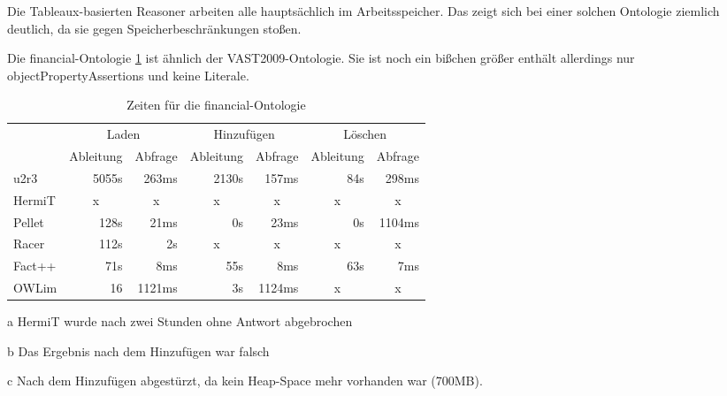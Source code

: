Die Tableaux-basierten Reasoner arbeiten alle hauptsächlich im Arbeitsspeicher. Das zeigt sich bei einer solchen Ontologie ziemlich deutlich, da sie gegen Speicherbeschränkungen stoßen.

Die financial-Ontologie \ref{table-time-financial} ist ähnlich der VAST2009-Ontologie. Sie ist noch ein bißchen größer enthält allerdings nur objectPropertyAssertions und keine Literale.

\begin{table}[htbp]
\caption{Zeiten für die financial-Ontologie}
\label{table-time-financial}
\begin{center}
\begin{threeparttable}
\begin{tabular}{l|r|r|r|r|r|r|}
\cline{2-7}
 & \multicolumn{2}{|c|}{Laden} & \multicolumn{2}{|c|}{Hinzufügen} & \multicolumn{2}{|c|}{Löschen} \\
\cline{2-7}
 & \multicolumn{1}{|c|}{Ableitung} & \multicolumn{1}{|c|}{Abfrage} & \multicolumn{1}{|c|}{Ableitung} & \multicolumn{1}{|c|}{Abfrage} & \multicolumn{1}{|c|}{Ableitung} & \multicolumn{1}{|c|}{Abfrage} \\
\hline
\multicolumn{1}{|l|}{u2r3} & 5055s & 263ms & 2130s & 157ms & 84s & 298ms \\ \hline
\multicolumn{1}{|l|}{HermiT\tnote{a}} & \multicolumn{1}{c|}{x} & \multicolumn{1}{c|}{x} & \multicolumn{1}{c|}{x} & \multicolumn{1}{c|}{x} & \multicolumn{1}{c|}{x} & \multicolumn{1}{c|}{x} \\ \hline
\multicolumn{1}{|l|}{Pellet\tnote{b}} & 128s & 21ms & 0s & 23ms & 0s & 1104ms \\ \hline
\multicolumn{1}{|l|}{Racer\tnote{c}} & 112s & 2s & \multicolumn{1}{c|}{x} & \multicolumn{1}{c|}{x} & \multicolumn{1}{c|}{x} & \multicolumn{1}{c|}{x} \\ \hline
\multicolumn{1}{|l|}{Fact++} & 71s & 8ms & 55s & 8ms & 63s & 7ms \\ \hline
\multicolumn{1}{|l|}{OWLim} & 16 & 1121ms & 3s & 1124ms & \multicolumn{1}{c|}{x} & \multicolumn{1}{c|}{x} \\ \hline
\end{tabular}
\begin{tablenotes}
	\item[a] HermiT wurde nach zwei Stunden ohne Antwort abgebrochen
	\item[b] Das Ergebnis nach dem Hinzufügen war falsch
	\item[c] Nach dem Hinzufügen abgestürzt, da kein Heap-Space mehr vorhanden war (700MB).
\end{tablenotes}
\end{threeparttable}
\end{center}
\end{table}

